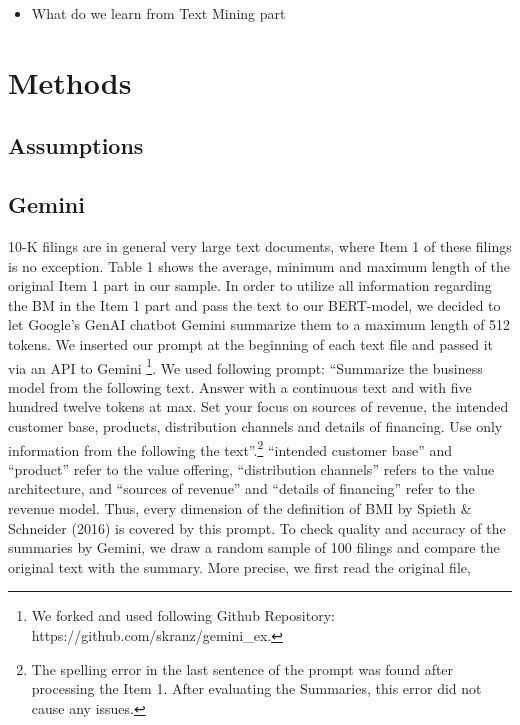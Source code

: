 \documentclass[
]{article}
\providecommand{\tightlist}{%
  \setlength{\itemsep}{0pt}\setlength{\parskip}{0pt}}\usepackage{longtable,booktabs,array}
\begin{document}
\begin{itemize}
\tightlist
\item
  What do we learn from Text Mining part
\end{itemize}

\section{Methods}\label{methods}

\subsection{Assumptions}\label{assumptions}

\subsection{Gemini}\label{gemini}

10-K filings are in general very large text documents, where Item 1 of
these filings is no exception. Table 1 shows the average, minimum and
maximum length of the original Item 1 part in our sample. In order to
utilize all information regarding the BM in the Item 1 part and pass the
text to our BERT-model, we decided to let Google's GenAI chatbot Gemini
summarize them to a maximum length of 512 tokens. We inserted our prompt
at the beginning of each text file and passed it via an API to Gemini
\footnote{We forked and used following Github Repository:
  https://github.com/skranz/gemini\_ex.}. We used following prompt:
``Summarize the business model from the following text. Answer with a
continuous text and with five hundred twelve tokens at max. Set your
focus on sources of revenue, the intended customer base, products,
distribution channels and details of financing. Use only information
from the following the text''.\footnote{The spelling error in the last
  sentence of the prompt was found after processing the Item 1. After
  evaluating the Summaries, this error did not cause any issues.}
``intended customer base'' and ``product'' refer to the value offering,
``distribution channels'' refers to the value architecture, and
``sources of revenue'' and ``details of financing'' refer to the revenue
model. Thus, every dimension of the definition of BMI by Spieth \&
Schneider (2016) is covered by this prompt. To check quality and
accuracy of the summaries by Gemini, we draw a random sample of 100
filings and compare the original text with the summary. More precise, we
first read the original file,
\end{document}
